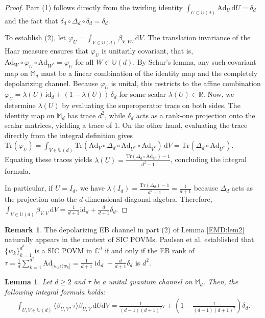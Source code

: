 \documentclass[11pt,reqno]{amsart}
\theoremstyle{definition}
\newtheorem{rmk}[defn]{Remark}
\theoremstyle{plain}
\newtheorem{lem}[defn]{Lemma}
\theoremstyle{remark}
\newcommand{\la}{\langle}
\newcommand{\ra}{\rangle}
\numberwithin{equation}{section}%
\begin{document}
\begin{proof}
	Part (1) follows directly from the twirling identity $\int_{U \in \mathbb{U}(d)} \text{Ad}_U \, \mathrm{d}U = \delta_d$ and the fact that $\delta_d\circ\Delta_d\circ\delta_d=\delta_d$.
	
	To establish (2), let $\varphi_U = \int_{V \in \mathbb{U}(d)} \beta_{V,VU} \, \mathrm{d}V$. The translation invariance of the Haar measure ensures that $\varphi_U$ is unitarily covariant, that is, $\text{Ad}_W \circ \varphi_U \circ \text{Ad}_{W^*} = \varphi_U$ for all $W \in \mathbb{U}(d)$. By Schur's lemma, any such covariant map on $\mathbb{M}_d$ must be a linear combination of the identity map and the completely depolarizing channel. Because $\varphi_U$ is unital, this restricts to the affine combination $\varphi_U = \lambda(U)\, \text{id}_d + (1-\lambda(U))\,\delta_d$ for some scalar $\lambda(U) \in \mathbb{R}$. Now, we determine $\lambda(U)$ by evaluating the superoperator trace on both sides. The identity map on $\mathbb{M}_d$ has trace $d^2$, while $\delta_d$ acts as a rank-one projection onto the scalar matrices, yielding a trace of $1$. On the other hand, evaluating the trace directly from the integral definition gives $\text{Tr}(\varphi_U) =\int_{V\in \mathbb{U}(d)} \text{Tr}(\text{Ad}_V\circ\Delta_d\circ\text{Ad}_{U^*}\circ\text{Ad}_{V^*})\,\mathrm{d}V = \text{Tr}(\Delta_d\circ\text{Ad}_{U^*})$. Equating these traces yields $\lambda(U) = \frac{\text{Tr}(\Delta_d\circ\text{Ad}_{U^*})-1}{d^2-1}$, concluding the integral formula. 
	
	
	In particular, if $U=I_d$, we have $\lambda(I_d)=\frac{\text{Tr}(\Delta_d)-1}{d^2-1}=\frac{1}{d+1}$ because $\Delta_d$ acts as the projection onto the $d$-dimensional diagonal algebra. Therefore, $\int_{V \in \mathbb{U}(d)} \beta_{V,V} \, \mathrm{d}V = \frac{1}{d+1}\text{id}_d + \frac{d}{d+1}\delta_d$.
\end{proof}



\begin{rmk}
	The depolarizing EB channel in part (2) of Lemma \ref{EMD:lem2} naturally appears in the context of SIC POVMs. Paulsen et al. \cite{PPPR} established that $\{w_k\}_{k=1}^{d^2}$ is a SIC POVM in $\mathbb{C}^d$ if and only if the EB rank of $\tau=\frac{1}{d}\sum_{k=1}^{d^2}\text{Ad}_{|w_k\ra\la w_k|}=\frac{1}{d+1}\operatorname{id}_d+\frac{d}{d+1}\delta_d$ is $d^2$. 
\end{rmk}



\begin{lem}\label{integral formula}
	Let $d\geq 2$ and $\tau$ be a unital quantum channel on $\mathbb{M}_d$. Then,  the following integral formula holds:
	\begin{align*}
		\int_{U,V \in \mathbb{U}(d)} \langle \beta_{U,V}, \tau \rangle \beta_{U,V} \, \mathrm{d}U \mathrm{d}V= \frac{1}{(d-1)(d+1)^2} \tau + \left( 1 - \frac{1}{(d-1)(d+1)^2} \right) \delta_d.
	\end{align*}
\end{lem}
\end{document}
